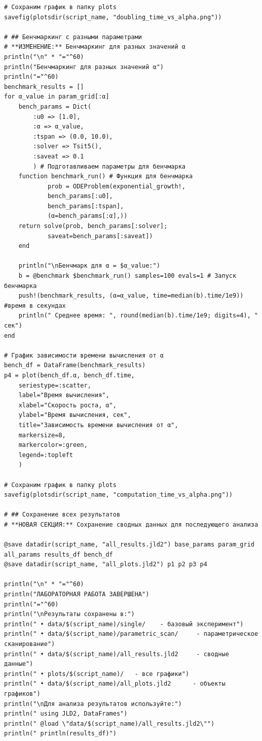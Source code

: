 \documentclass[
  english,
  russian,
  12pt,
  a4paper,
  DIV=11,
  numbers=noendperiod]{scrreprt}
\begin{document}
\begin{verbatim}
# Сохраним график в папку plots
savefig(plotsdir(script_name, "doubling_time_vs_alpha.png"))

# ## Бенчмаркинг с разными параметрами
# **ИЗМЕНЕНИЕ:** Бенчмаркинг для разных значений α
println("\n" * "="^60)
println("Бенчмаркинг для разных значений α")
println("="^60)
benchmark_results = []
for α_value in param_grid[:α]
    bench_params = Dict(
        :u0 => [1.0],
        :α => α_value,
        :tspan => (0.0, 10.0),
        :solver => Tsit5(),
        :saveat => 0.1
        ) # Подготавливаем параметры для бенчмарка
    function benchmark_run() # Функция для бенчмарка
            prob = ODEProblem(exponential_growth!,
            bench_params[:u0],
            bench_params[:tspan],
            (α=bench_params[:α],))
    return solve(prob, bench_params[:solver];
            saveat=bench_params[:saveat])
    end
    
    println("\nБенчмарк для α = $α_value:")
    b = @benchmark $benchmark_run() samples=100 evals=1 # Запуск бенчмарка
    push!(benchmark_results, (α=α_value, time=median(b).time/1e9)) #время в секундах
    println(" Среднее время: ", round(median(b).time/1e9; digits=4), " сек")
end

# График зависимости времени вычисления от α
bench_df = DataFrame(benchmark_results)
p4 = plot(bench_df.α, bench_df.time,
    seriestype=:scatter,
    label="Время вычисления",
    xlabel="Скорость роста, α",
    ylabel="Время вычисления, сек",
    title="Зависимость времени вычисления от α",
    markersize=8,
    markercolor=:green,
    legend=:topleft
    )
    
# Сохраним график в папку plots
savefig(plotsdir(script_name, "computation_time_vs_alpha.png"))

# ## Сохранение всех результатов
# **НОВАЯ СЕКЦИЯ:** Сохранение сводных данных для последующего анализа

@save datadir(script_name, "all_results.jld2") base_params param_grid all_params results_df bench_df
@save datadir(script_name, "all_plots.jld2") p1 p2 p3 p4

println("\n" * "="^60)
println("ЛАБОРАТОРНАЯ РАБОТА ЗАВЕРШЕНА")
println("="^60)
println("\nРезультаты сохранены в:")
println(" • data/$(script_name)/single/    - базовый эксперимент")
println(" • data/$(script_name)/parametric_scan/     - параметрическое сканирование")
println(" • data/$(script_name)/all_results.jld2     - сводные данные")
println(" • plots/$(script_name)/   - все графики")
println(" • data/$(script_name)/all_plots.jld2      - объекты графиков")
println("\nДля анализа результатов используйте:")
println(" using JLD2, DataFrames")
println(" @load \"data/$(script_name)/all_results.jld2\"")
println(" println(results_df)")

\end{verbatim}
\end{document}
